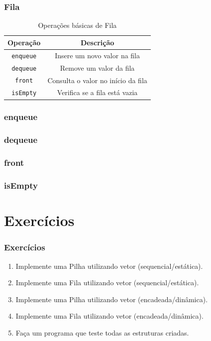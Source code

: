 \documentclass{beamer}
\begin{document}
\begin{frame}
	\frametitle{Fila}
    \begin{table}
        \caption{Operações básicas de Fila}
        \label{tab:fila}
        \begin{tabular}{| c | c |}
            \hline
            Operação & Descrição \\ \hline
            \texttt{enqueue} & Insere um novo valor na fila \\ \hline
            \texttt{dequeue} & Remove um valor da fila \\ \hline
            \texttt{front} & Consulta o valor no início da fila \\ \hline
            \texttt{isEmpty} & Verifica se a fila está vazia \\ \hline
        \end{tabular}
    \end{table}
\end{frame}

\begin{frame}
	\frametitle{enqueue}
    \centering
    
\end{frame}

\begin{frame}
	\frametitle{dequeue}
    \centering
    
\end{frame}

\begin{frame}
	\frametitle{front}
    \centering
    
\end{frame}

\begin{frame}
	\frametitle{isEmpty}
    \centering
    
\end{frame}

\section{Exercícios}

\begin{frame}
    \frametitle{Exercícios}
    \begin{enumerate}
        \item Implemente uma Pilha utilizando vetor (sequencial/estática).
        \item Implemente uma Fila utilizando vetor (sequencial/estática).
        \item Implemente uma Pilha utilizando vetor (encadeada/dinâmica).
        \item Implemente uma Fila utilizando vetor (encadeada/dinâmica).
        \item Faça um programa que teste todas as estruturas criadas.
    \end{enumerate}
\end{frame}
\end{document}
